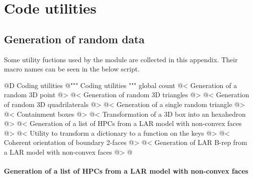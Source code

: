 \documentclass[11pt,oneside]{article}    %
\begin{document}
\appendix
\section{Code utilities}

\subsection{Generation of random data}

Some utility fuctions used by the module are collected in this appendix. Their macro names can be seen in the below script.

@D Coding utilities
@{""" Coding utilities """
global count
@< Generation of a random 3D point @>
@< Generation of random 3D triangles @>
@< Generation of random 3D quadrilaterals @>
@< Generation of a single random triangle @>
@< Containment boxes @>
@< Transformation of a 3D box into an hexahedron @>
@< Generation of a list of HPCs from a LAR model with non-convex faces @>
@< Utility to transform a dictionary to a function on the keys @>
@< Coherent orientation of boundary 2-faces @>
@< Generation of LAR B-rep from a LAR model with non-convex faces @>
@}


\paragraph{Generation of a list of HPCs from a LAR model with non-convex faces}
\end{document}
